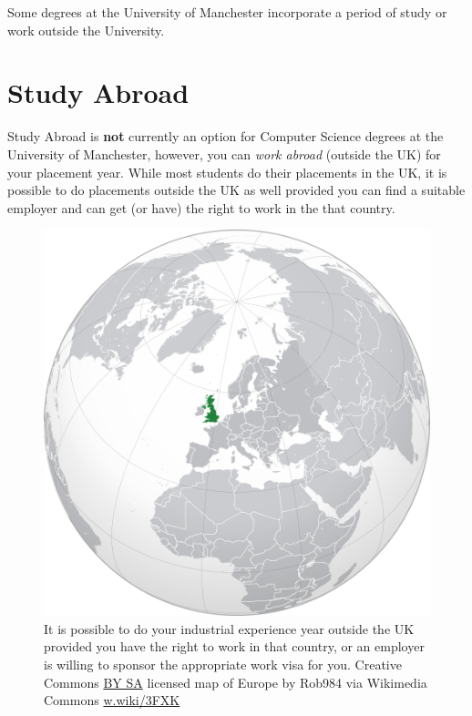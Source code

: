 \documentclass[
]{book}
\begin{document}
Some degrees at the University of Manchester incorporate a period of study or work outside the University. \citep{studyabroad}

\section{Study Abroad}\label{abroad}

Study Abroad is \textbf{not} currently an option for Computer Science degrees at the University of Manchester, however, you can \emph{work abroad} (outside the UK) for your placement year. While most students do their placements in the UK, it is possible to do placements outside the UK as well provided you can find a suitable employer and can get (or have) the right to work in the that country.

\begin{figure}

{\centering \includegraphics[width=0.9\linewidth]{images/outsideuk} 

}

\caption{It is possible to do your industrial experience year outside the UK provided you have the right to work in that country, or an employer is willing to sponsor the appropriate work visa for you. Creative Commons \href{https://creativecommons.org/licenses/by-sa/4.0/deed.en}{BY SA} licensed map of Europe by Rob984 via Wikimedia Commons \href{https://w.wiki/3FXK}{w.wiki/3FXK}}\label{fig:notuk-fig}
\end{figure}
\end{document}
